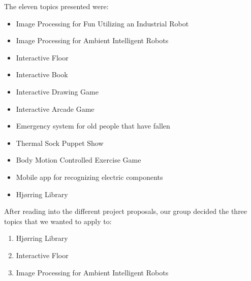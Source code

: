 

The eleven topics presented were:

\begin{itemize}
\item Image Processing for Fun Utilizing an Industrial Robot
\item Image Processing for Ambient Intelligent Robots
\item Interactive Floor
\item Interactive Book
\item Interactive Drawing Game
\item Interactive Arcade Game
\item Emergency system for old people that have fallen
\item Thermal Sock Puppet Show
\item Body Motion Controlled Exercise Game
\item Mobile app for recognizing electric components
\item Hj{\o}rring Library
\end{itemize}

After reading into the different project proposals, our group decided the three topics that we wanted to apply to:

\begin{enumerate} 
\item Hj{\o}rring Library 
\item Interactive Floor 
\item Image Processing for Ambient Intelligent Robots 
\end{enumerate}

